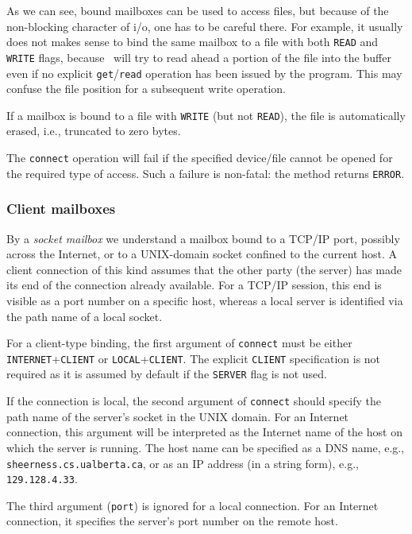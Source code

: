 \medskip

\noindent
As we can see, bound mailboxes can be used to access files, but because of
the non-blocking character of i/o, one has to be careful there.
For example, it usually does not makes sense to bind the same mailbox to
a file with both {\tt READ} and {\tt WRITE} flags, because \smurph\ will try
to read ahead a portion of the file into the buffer even if no explicit
{\tt get}/{\tt read} operation has been issued by the program.
This may confuse the file position for a subsequent write operation.

If a mailbox is bound to a file with {\tt WRITE} (but not {\tt READ}),
the file is automatically erased, i.e., truncated to zero bytes.

The {\tt connect} operation will fail if the specified device/file
cannot be opened for the required type of access.
Such a failure is non-fatal: the method returns {\tt ERROR}.

\subsubsection{Client mailboxes}
\label{rm_mb_bo_cs}

By a {\em socket mailbox\/} we understand a mailbox bound to a TCP/IP
port, possibly across the Internet, or to a UNIX-domain socket confined
to the current host.
A client connection of this kind assumes that the other party (the
server) has made its end of the connection already available.
For a TCP/IP session, this end is visible as a port number on a specific
host, whereas a local server is identified via the path name of a local
socket.

For a client-type binding, the first argument of {\tt connect}
must be either {\tt INTERNET}+{\tt CLIENT} or {\tt LOCAL}+{\tt CLIENT}.
The explicit {\tt CLIENT} specification is not required as it is assumed
by default if the {\tt SERVER} flag is not used.

If the connection is local, the second argument of {\tt connect} should
specify the path name of the server's socket in the UNIX domain.
For an Internet connection, this argument will be interpreted
as the Internet name of the host on which the server is running.
The host name can be specified as a DNS name, e.g.,
{\tt sheerness.cs.ualberta.ca}, or as an IP address (in a string form),
e.g., {\tt 129.128.4.33}.

The third argument ({\tt port}) is ignored for a local connection.
For an Internet connection, it specifies the server's
port number on the remote host.

